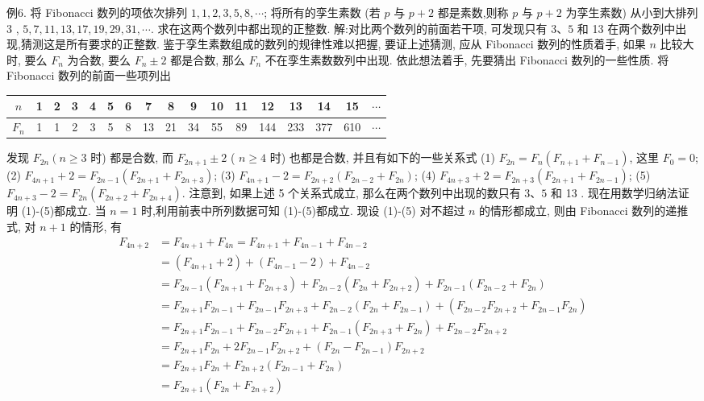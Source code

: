 例6. 将 Fibonacci 数列的项依次排列 $1,1,2,3,5,8, \cdots$; 将所有的孪生素数 (若 $p$ 与 $p+2$ 都是素数,则称 $p$ 与 $p+2$ 为孪生素数) 从小到大排列 3 , $5,7,11,13,17,19,29,31, \cdots$. 求在这两个数列中都出现的正整数.
解:对比两个数列的前面若干项, 可发现只有 $3 、 5$ 和 13 在两个数列中出现,猜测这是所有要求的正整数.
鉴于孪生素数组成的数列的规律性难以把握, 要证上述猜测, 应从 Fibonacci 数列的性质着手, 如果 $n$ 比较大时, 要么 $F_n$ 为合数, 要么 $F_n \pm 2$ 都是合数, 那么 $F_n$ 不在孪生素数数列中出现.
依此想法着手, 先要猜出 Fibonacci 数列的一些性质.
将 Fibonacci 数列的前面一些项列出
\begin{tabular}{|c|c|c|c|c|c|c|c|c|c|c|c|c|c|c|c|c|}
\hline$n$ & 1 & 2 & 3 & 4 & 5 & 6 & 7 & 8 & 9 & 10 & 11 & 12 & 13 & 14 & 15 & $\cdots$ \\
\hline$F_n$ & 1 & 1 & 2 & 3 & 5 & 8 & 13 & 21 & 34 & 55 & 89 & 144 & 233 & 377 & 610 & $\cdots$ \\
\hline
\end{tabular}
发现 $F_{2 n}\left(n \geqslant 3\right.$ 时) 都是合数, 而 $F_{2 n+1} \pm 2$ ( $n \geqslant 4$ 时) 也都是合数, 并且有如下的一些关系式
(1) $F_{2 n}=F_n\left(F_{n+1}+F_{n-1}\right)$, 这里 $F_0=0$;
(2) $F_{4 n+1}+2=F_{2 n-1}\left(F_{2 n+1}+F_{2 n+3}\right)$;
(3) $F_{4 n+1}-2=F_{2 n+2}\left(F_{2 n-2}+F_{2 n}\right)$;
(4) $F_{4 n+3}+2=F_{2 n+3}\left(F_{2 n+1}+F_{2 n-1}\right)$;
(5) $F_{4 n+3}-2=F_{2 n}\left(F_{2 n+2}+F_{2 n+4}\right)$.
注意到, 如果上述 5 个关系式成立, 那么在两个数列中出现的数只有 $3 、 5$ 和 13 . 现在用数学归纳法证明 (1)-(5)都成立.
当 $n=1$ 时,利用前表中所列数据可知 (1)-(5)都成立.
现设 (1)-(5) 对不超过 $n$ 的情形都成立, 则由 Fibonacci 数列的递推式, 对 $n+1$ 的情形, 有
$$
\begin{aligned}
F_{4 n+2} & =F_{4 n+1}+F_{4 n}=F_{4 n+1}+F_{4 n-1}+F_{4 n-2} \\
& =\left(F_{4 n+1}+2\right)+\left(F_{4 n-1}-2\right)+F_{4 n-2} \\
& =F_{2 n-1}\left(F_{2 n+1}+F_{2 n+3}\right)+F_{2 n-2}\left(F_{2 n}+F_{2 n+2}\right)+F_{2 n-1}\left(F_{2 n-2}+F_{2 n}\right) \\
& =F_{2 n+1} F_{2 n-1}+F_{2 n-1} F_{2 n+3}+F_{2 n-2}\left(F_{2 n}+F_{2 n-1}\right)+\left(F_{2 n-2} F_{2 n+2}+F_{2 n-1} F_{2 n}\right) \\
& =F_{2 n+1} F_{2 n-1}+F_{2 n-2} F_{2 n+1}+F_{2 n-1}\left(F_{2 n+3}+F_{2 n}\right)+F_{2 n-2} F_{2 n+2} \\
& =F_{2 n+1} F_{2 n}+2 F_{2 n-1} F_{2 n+2}+\left(F_{2 n}-F_{2 n-1}\right) F_{2 n+2} \\
& =F_{2 n+1} F_{2 n}+F_{2 n+2}\left(F_{2 n-1}+F_{2 n}\right) \\
& =F_{2 n+1}\left(F_{2 n}+F_{2 n+2}\right)
\end{aligned}
$$
